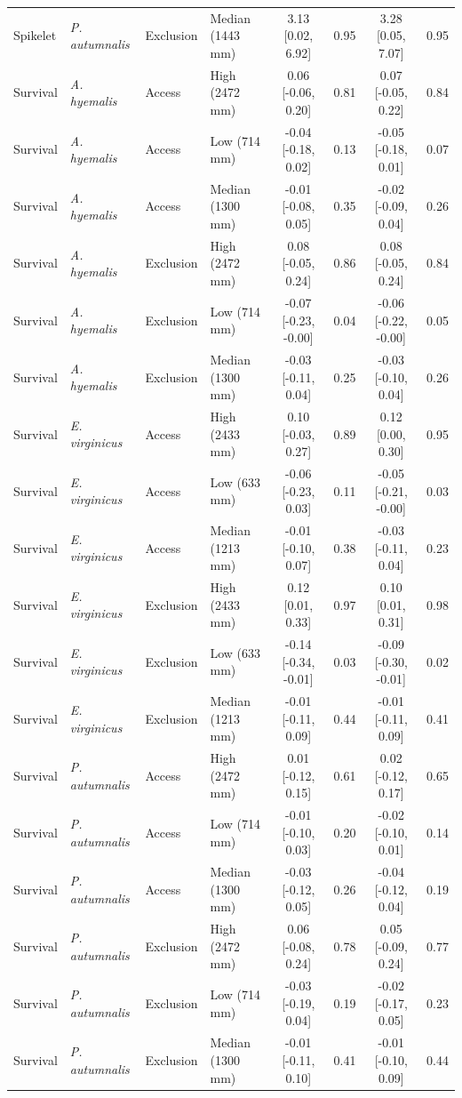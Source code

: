 \begin{landscape}
\begin{longtable}{llllcccc}
  Spikelet & \textit{P. autumnalis} & Exclusion & Median (1443 mm) & 3.13 [0.02, 6.92] & 0.95 & 3.28 [0.05, 7.07] & 0.95 \\
  Survival & \textit{A. hyemalis} & Access & High (2472 mm) & 0.06 [-0.06, 0.20] & 0.81 & 0.07 [-0.05, 0.22] & 0.84 \\
  Survival & \textit{A. hyemalis} & Access & Low (714 mm) & -0.04 [-0.18, 0.02] & 0.13 & -0.05 [-0.18, 0.01] & 0.07 \\
  Survival & \textit{A. hyemalis} & Access & Median (1300 mm) & -0.01 [-0.08, 0.05] & 0.35 & -0.02 [-0.09, 0.04] & 0.26 \\
  Survival & \textit{A. hyemalis} & Exclusion & High (2472 mm) & 0.08 [-0.05, 0.24] & 0.86 & 0.08 [-0.05, 0.24] & 0.84 \\
  Survival & \textit{A. hyemalis} & Exclusion & Low (714 mm) & -0.07 [-0.23, -0.00] & 0.04 & -0.06 [-0.22, -0.00] & 0.05 \\
  Survival & \textit{A. hyemalis} & Exclusion & Median (1300 mm) & -0.03 [-0.11, 0.04] & 0.25 & -0.03 [-0.10, 0.04] & 0.26 \\
  Survival & \textit{E. virginicus} & Access & High (2433 mm) & 0.10 [-0.03, 0.27] & 0.89 & 0.12 [0.00, 0.30] & 0.95 \\
  Survival & \textit{E. virginicus} & Access & Low (633 mm) & -0.06 [-0.23, 0.03] & 0.11 & -0.05 [-0.21, -0.00] & 0.03 \\
  Survival & \textit{E. virginicus} & Access & Median (1213 mm) & -0.01 [-0.10, 0.07] & 0.38 & -0.03 [-0.11, 0.04] & 0.23 \\
  Survival & \textit{E. virginicus} & Exclusion & High (2433 mm) & 0.12 [0.01, 0.33] & 0.97 & 0.10 [0.01, 0.31] & 0.98 \\
  Survival & \textit{E. virginicus} & Exclusion & Low (633 mm) & -0.14 [-0.34, -0.01] & 0.03 & -0.09 [-0.30, -0.01] & 0.02 \\
  Survival & \textit{E. virginicus} & Exclusion & Median (1213 mm) & -0.01 [-0.11, 0.09] & 0.44 & -0.01 [-0.11, 0.09] & 0.41 \\
  Survival & \textit{P. autumnalis} & Access & High (2472 mm) & 0.01 [-0.12, 0.15] & 0.61 & 0.02 [-0.12, 0.17] & 0.65 \\
  Survival & \textit{P. autumnalis} & Access & Low (714 mm) & -0.01 [-0.10, 0.03] & 0.20 & -0.02 [-0.10, 0.01] & 0.14 \\
  Survival & \textit{P. autumnalis} & Access & Median (1300 mm) & -0.03 [-0.12, 0.05] & 0.26 & -0.04 [-0.12, 0.04] & 0.19 \\
  Survival & \textit{P. autumnalis} & Exclusion & High (2472 mm) & 0.06 [-0.08, 0.24] & 0.78 & 0.05 [-0.09, 0.24] & 0.77 \\
  Survival & \textit{P. autumnalis} & Exclusion & Low (714 mm) & -0.03 [-0.19, 0.04] & 0.19 & -0.02 [-0.17, 0.05] & 0.23 \\
  Survival & \textit{P. autumnalis} & Exclusion & Median (1300 mm) & -0.01 [-0.11, 0.10] & 0.41 & -0.01 [-0.10, 0.09] & 0.44 \\
\end{longtable}
\end{landscape}
